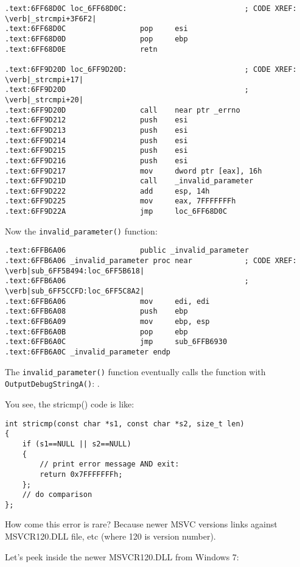 \begin{lstlisting}[style=customasmx86]
.text:6FF68D0C loc_6FF68D0C:                           ; CODE XREF: \verb|_strcmpi+3F6F2|
.text:6FF68D0C                 pop     esi
.text:6FF68D0D                 pop     ebp
.text:6FF68D0E                 retn

.text:6FF9D20D loc_6FF9D20D:                           ; CODE XREF: \verb|_strcmpi+17|
.text:6FF9D20D                                         ; \verb|_strcmpi+20|
.text:6FF9D20D                 call    near ptr _errno
.text:6FF9D212                 push    esi
.text:6FF9D213                 push    esi
.text:6FF9D214                 push    esi
.text:6FF9D215                 push    esi
.text:6FF9D216                 push    esi
.text:6FF9D217                 mov     dword ptr [eax], 16h
.text:6FF9D21D                 call    _invalid_parameter
.text:6FF9D222                 add     esp, 14h
.text:6FF9D225                 mov     eax, 7FFFFFFFh
.text:6FF9D22A                 jmp     loc_6FF68D0C
\end{lstlisting}

Now the \verb|invalid_parameter()| function:

\begin{lstlisting}[style=customasmx86]
.text:6FFB6A06                 public _invalid_parameter
.text:6FFB6A06 _invalid_parameter proc near            ; CODE XREF: \verb|sub_6FF5B494:loc_6FF5B618|
.text:6FFB6A06                                         ; \verb|sub_6FF5CCFD:loc_6FF5C8A2|
.text:6FFB6A06                 mov     edi, edi
.text:6FFB6A08                 push    ebp
.text:6FFB6A09                 mov     ebp, esp
.text:6FFB6A0B                 pop     ebp
.text:6FFB6A0C                 jmp     sub_6FFB6930
.text:6FFB6A0C _invalid_parameter endp
\end{lstlisting}

The \verb|invalid_parameter()| function eventually calls the function with \verb|OutputDebugStringA()|:
.

You see, the stricmp() code is like:

\begin{lstlisting}[style=customc]
int stricmp(const char *s1, const char *s2, size_t len)
{
	if (s1==NULL || s2==NULL)
	{
		// print error message AND exit:
		return 0x7FFFFFFFh;
	};
	// do comparison
};
\end{lstlisting}

How come this error is rare? Because newer MSVC versions links against MSVCR120.DLL file, etc (where 120 is version number).

Let's peek inside the newer MSVCR120.DLL from Windows 7:

